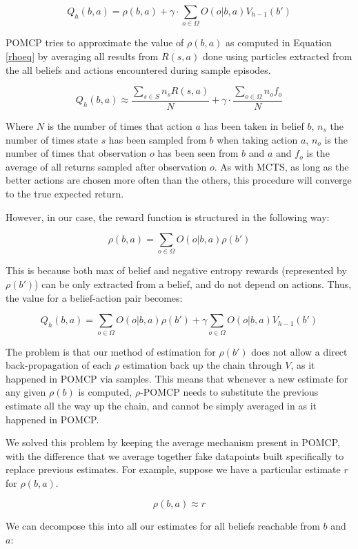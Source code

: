 \[ Q_h(b,a) = \rho(b,a) + \gamma \cdot \sum_{o\in \Omega} O(o|b,a) V_{h-1}(b') \]

POMCP tries to approximate the value of $\rho(b,a)$ as computed in Equation \ref{rhoeq} by averaging
all results from $R(s,a)$ done using particles extracted from the all beliefs and actions
encountered during sample episodes.

\[ Q_h(b,a) \approx \frac{\sum_{s \in S} n_s R(s,a)}{N} + \gamma \cdot \frac{\sum_{o\in \Omega} n_o f_o}{N} \]

Where $N$ is the number of times that action $a$ has been taken in belief $b$, $n_s$ the number of
times state $s$ has been sampled from $b$ when taking action $a$, $n_o$ is the number of times that
observation $o$ has been seen from $b$ and $a$ and $f_o$ is the average of all returns sampled after
observation $o$. As with MCTS, as long as the better actions are chosen more often than the others,
this procedure will converge to the true expected return.

However, in our case, the reward function is structured in the following way:

\[ \rho(b,a) = \sum_{o\in \Omega} O(o | b, a) \rho(b') \]

This is because both max of belief and negative entropy rewards (represented by $\rho(b')$) can be
only extracted from a belief, and do not depend on actions. Thus, the value for a belief-action pair
becomes:

\[ Q_h(b,a) = \sum_{o\in \Omega} O(o | b,a) \rho(b') + \gamma\sum_{o\in\Omega} O(o|b,a) V_{h-1}(b') \]

The problem is that our method of estimation for $\rho(b')$ does not allow a direct back-propagation
of each $\rho$ estimation back up the chain through $V$, as it happened in POMCP via samples. This
means that whenever a new estimate for any given $\rho(b)$ is computed, $\rho$-POMCP needs to
substitute the previous estimate all the way up the chain, and cannot be simply averaged in as it
happened in POMCP.

We solved this problem by keeping the average mechanism present in POMCP, with the difference that
we average together fake datapoints built specifically to replace previous estimates. For
example, suppose we have a particular estimate $r$ for $\rho(b, a)$.

\[ \rho(b,a) \approx r \]

We can decompose this into all our estimates for all beliefs reachable from $b$ and $a$:

